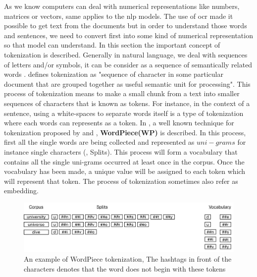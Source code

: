 As we know computers can deal with numerical representations like numbers, matrices or vectors, same applies to the \acrshort{nlp} models. The use of \acrshort{ocr} made it possible to get text from the documents but in order to understand those words and sentences, we need to convert first into some kind of numerical representation so that model can understand. In this section the important concept of tokenization is described. Generally in natural language, we deal with sequences of letters and/or symbols, it can be consider as a sequence of semantically related words \cite{faber2012constructing}. \cite{manning2008introduction} defines tokenization as "sequence of character in some particular document that are grouped together as useful semantic unit for processing". This process of tokenization means to make a small chunk from a text into smaller sequences of characters that is known as tokens. For instance, in the context of a sentence, using a white-spaces to separate words itself is a type of tokenization where each words can represents as a token. In , a well known technique for tokenization proposed by \cite{schuster2012japanese} and \cite{wu2016google}, \textbf{WordPiece(WP)} is described. In this process, first all the single words are being collected and represented as $uni-grams$ for instance single characters (, Splits). This process will form a vocabulary that contains all the single uni-grams occurred at least once in the corpus. Once the vocabulary has been made, a unique value will be assigned to each token which will represent that token. The process of tokenization sometimes also refer as embedding.  

\begin{figure}[!ht]
    \centering
    \captionsetup{justification=centering}
    \includegraphics[width=1 \textwidth]{chapters/images/Tokenization/Tokenization.png}
    \caption{An example of WordPiece tokenization, The hashtags in front of the characters denotes that the word does not begin with these tokens}
    \label{fig:Tokenization}
\end{figure}



